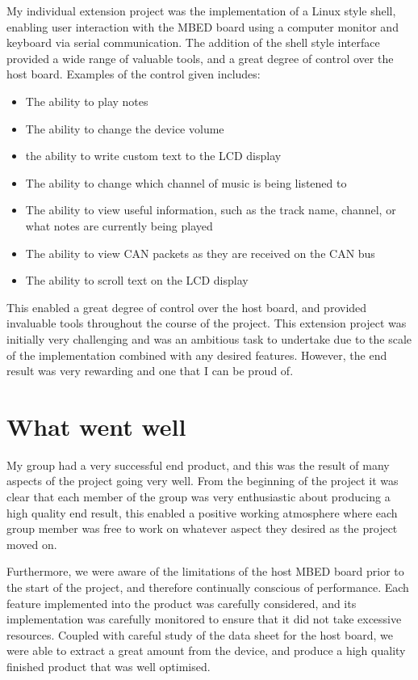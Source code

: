 My individual extension project was the implementation of a Linux style shell, 
enabling user interaction with the MBED board using a computer monitor and 
keyboard via serial communication. The addition of the shell style interface 
provided a wide range of valuable tools, and a great degree of control over the 
host board. Examples of the control given includes: 
\begin{itemize}
    \item The ability to play notes
    \item The ability to change the device volume
    \item the ability to write custom text to the LCD display 
    \item The ability to change which channel of music is being listened to
    \item The ability to view useful information, such as the track name, channel,
or what notes are currently being played
    \item The ability to view CAN packets as they are received on the CAN bus 
    \item The ability to scroll text on the LCD display 
\end{itemize}
This enabled a great degree of control over the host board, and provided 
invaluable tools throughout the course of the project. This extension project 
was initially very challenging and was an ambitious task to undertake due to the 
scale of the implementation combined with any desired features. However, the end 
result was very rewarding and one that I can be proud of. 

\section{What went well}

My group had a very successful end product, and this was the result of many 
aspects of the project going very well. From the beginning of the project it was 
clear that each member of the group was very enthusiastic about producing a high 
quality end result, this enabled a positive working atmosphere where each group 
member was free to work on whatever aspect they desired as the project moved on.
\par\bigskip\noindent
Furthermore, we were aware of the limitations of the host MBED board prior to the 
start of the project, and therefore continually conscious of performance. Each 
feature implemented into the product was carefully considered, and its 
implementation was carefully monitored to ensure that it did not take excessive 
resources. Coupled with careful study of the data sheet for the host board, we 
were able to extract a great amount from the device, and produce a high quality 
finished product that was well optimised. 

